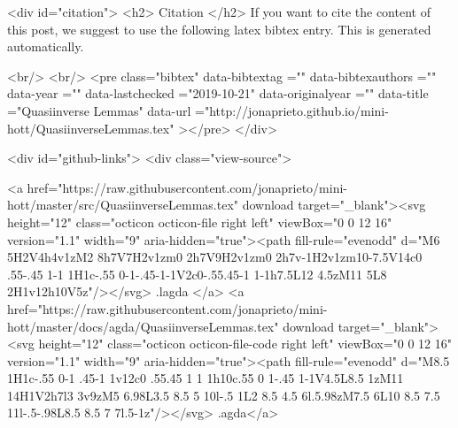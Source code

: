   
  <div id="citation">
  <h2> Citation </h2>
  If you want to cite the content of this post,
  we suggest to use the following latex bibtex entry.
  This is generated automatically.

  <br/>
  <br/>
  <pre class="bibtex"
       data-bibtextag =""
       data-bibtexauthors =""
       data-year =""
       data-lastchecked ="2019-10-21"
       data-originalyear =""
       data-title ="Quasiinverse Lemmas"
       data-url ="http://jonaprieto.github.io/mini-hott/QuasiinverseLemmas.tex"
  ></pre>
  </div>
  

  <div id="github-links">
    <div class="view-source">
      
        <a href="https://raw.githubusercontent.com/jonaprieto/mini-hott/master/src/QuasiinverseLemmas.tex" download target="_blank"><svg height="12" class="octicon octicon-file right left" viewBox="0 0 12 16" version="1.1" width="9" aria-hidden="true"><path fill-rule="evenodd" d="M6 5H2V4h4v1zM2 8h7V7H2v1zm0 2h7V9H2v1zm0 2h7v-1H2v1zm10-7.5V14c0 .55-.45 1-1 1H1c-.55 0-1-.45-1-1V2c0-.55.45-1 1-1h7.5L12 4.5zM11 5L8 2H1v12h10V5z"/></svg> .lagda </a>
        <a href="https://raw.githubusercontent.com/jonaprieto/mini-hott/master/docs/agda/QuasiinverseLemmas.tex" download target="_blank"><svg height="12" class="octicon octicon-file-code right left" viewBox="0 0 12 16" version="1.1" width="9" aria-hidden="true"><path fill-rule="evenodd" d="M8.5 1H1c-.55 0-1 .45-1 1v12c0 .55.45 1 1 1h10c.55 0 1-.45 1-1V4.5L8.5 1zM11 14H1V2h7l3 3v9zM5 6.98L3.5 8.5 5 10l-.5 1L2 8.5 4.5 6l.5.98zM7.5 6L10 8.5 7.5 11l-.5-.98L8.5 8.5 7 7l.5-1z"/></svg> .agda</a>
      
